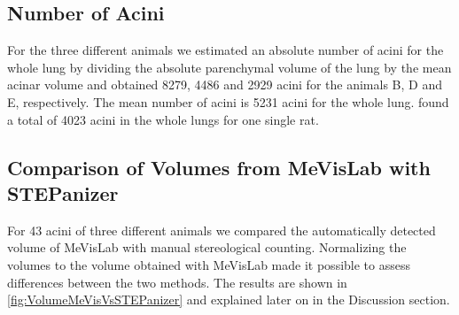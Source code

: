 \documentclass[%
	twoside,
	paper=a4,%
	abstract=true,%
	]{scrartcl}
\newcommand{\numberofacini}{43}
\begin{document}

\subsection{Number of Acini}
For the three different animals we estimated an absolute number of acini for the whole lung by dividing the absolute parenchymal volume of the lung by the mean acinar volume and obtained 8279, 4486 and 2929 acini for the animals B, D and E, respectively. The mean number of acini is 5231 acini for the whole lung. \citet[page 146]{Rodriguez1987} found a total of 4023 acini in the whole lungs for one single rat.

\subsection{Comparison of Volumes from MeVisLab with STEPanizer}
For \numberofacini\xspace acini of three different animals we compared the automatically detected volume of MeVisLab with manual stereological counting. Normalizing the volumes to the volume obtained with MeVisLab made it possible to assess differences between the two methods. The results are shown in \autoref{fig:VolumeMeVisVsSTEPanizer} and explained later on in the Discussion section.
\end{document}
